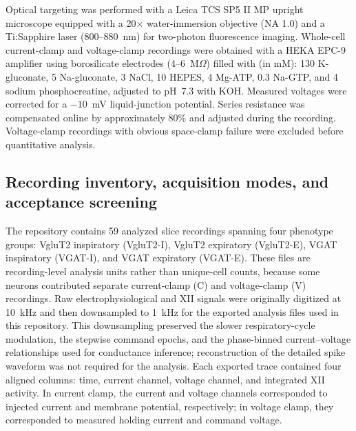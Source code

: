 \documentclass[11pt]{article}
\begin{document}
Optical targeting was performed with a Leica TCS SP5 II MP upright microscope equipped with a 20$\times$ water-immersion objective (NA 1.0) and a Ti:Sapphire laser (800--880~nm) for two-photon fluorescence imaging. Whole-cell current-clamp and voltage-clamp recordings were obtained with a HEKA EPC-9 amplifier using borosilicate electrodes (4--6~M$\Omega$) filled with (in mM): 130 K-gluconate, 5 Na-gluconate, 3 NaCl, 10 HEPES, 4 Mg-ATP, 0.3 Na-GTP, and 4 sodium phosphocreatine, adjusted to pH~7.3 with KOH. Measured voltages were corrected for a $-10$~mV liquid-junction potential. Series resistance was compensated online by approximately 80\% and adjusted during the recording. Voltage-clamp recordings with obvious space-clamp failure were excluded before quantitative analysis.

\subsection{Recording inventory, acquisition modes, and acceptance screening}
The repository contains 59 analyzed slice recordings spanning four phenotype groups: VgluT2 inspiratory (VgluT2-I), VgluT2 expiratory (VgluT2-E), VGAT inspiratory (VGAT-I), and VGAT expiratory (VGAT-E). These files are recording-level analysis units rather than unique-cell counts, because some neurons contributed separate current-clamp (C) and voltage-clamp (V) recordings. Raw electrophysiological and XII signals were originally digitized at 10~kHz and then downsampled to 1~kHz for the exported analysis files used in this repository. This downsampling preserved the slower respiratory-cycle modulation, the stepwise command epochs, and the phase-binned current--voltage relationships used for conductance inference; reconstruction of the detailed spike waveform was not required for the analysis. Each exported trace contained four aligned columns: time, current channel, voltage channel, and integrated XII activity. In current clamp, the current and voltage channels corresponded to injected current and membrane potential, respectively; in voltage clamp, they corresponded to measured holding current and command voltage.
\end{document}
